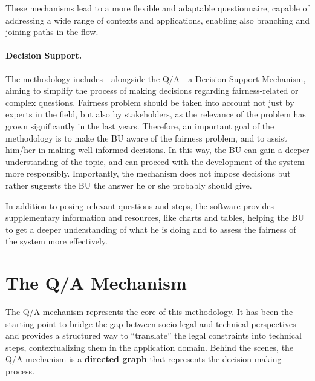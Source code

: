 \documentclass[12pt,a4paper,openright,twoside]{book}
\begin{document}
These mechanisms lead to a more flexible and adaptable questionnaire, capable of addressing a wide range of contexts and applications, enabling also branching and joining paths in the flow.



\paragraph{Decision Support.}
The methodology includes---alongside the \ac{Q/A}---a Decision Support Mechanism, aiming to simplify the process of making decisions regarding fairness-related or complex questions.
%
Fairness problem should be taken into account not just by experts in the field, but also by stakeholders, as the relevance of the problem has grown significantly in the last years.
%
Therefore, an important goal of the methodology is to make the \ac{BU} aware of the fairness problem, and to assist him/her in making well-informed decisions.
%
In this way, the \ac{BU} can gain a deeper understanding of the topic, and can proceed with the development of the system more responsibly.
%
Importantly, the mechanism does not impose decisions but rather suggests the \ac{BU} the answer he or she probably should give.

In addition to posing relevant questions and steps, the software provides supplementary information and resources, like charts and tables, helping the \ac{BU} to get a deeper understanding of what he is doing and to assess the fairness of the system more effectively.


\section{The \acs{Q/A} Mechanism}

The \acf{Q/A} mechanism represents the core of this methodology.
%
It has been the starting point to bridge the gap between socio-legal and technical perspectives and provides a structured way to ``translate'' the legal constraints into technical steps, contextualizing them in the application domain.
%
Behind the scenes, the \ac{Q/A} mechanism is a \textbf{directed graph} that represents the decision-making process.
\end{document}
